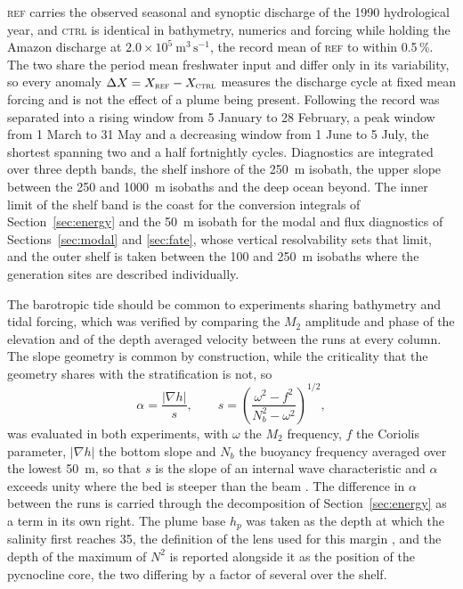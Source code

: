 \documentclass[a4paper,fleqn]{cas-sc}
\newcommand{\REF}{\textsc{ref}}
\newcommand{\CTRL}{\textsc{ctrl}}
\begin{document}
\REF{} carries the observed seasonal and synoptic discharge of the 1990 hydrological year, and \CTRL{} is identical in bathymetry, numerics and forcing while holding the Amazon discharge at $2.0\times10^{5}\ \mathrm{m^{3}\,s^{-1}}$, the record mean of \REF{} to within 0.5\,\%. The two share the period mean freshwater input and differ only in its variability, so every anomaly $\Delta X=X_{\REF}-X_{\CTRL}$ measures the discharge cycle at fixed mean forcing and is not the effect of a plume being present. Following \citet{nascimento:2026} the record was separated into a rising window from 5 January to 28 February, a peak window from 1 March to 31 May and a decreasing window from 1 June to 5 July, the shortest spanning two and a half fortnightly cycles. Diagnostics are integrated over three depth bands, the shelf inshore of the 250~m isobath, the upper slope between the 250 and 1000~m isobaths and the deep ocean beyond. The inner limit of the shelf band is the coast for the conversion integrals of Section~\ref{sec:energy} and the 50~m isobath for the modal and flux diagnostics of Sections~\ref{sec:modal} and \ref{sec:fate}, whose vertical resolvability sets that limit, and the outer shelf is taken between the 100 and 250~m isobaths where the generation sites are described individually.

The barotropic tide should be common to experiments sharing bathymetry and tidal forcing, which was verified by comparing the $M_{2}$ amplitude and phase of the elevation and of the depth averaged velocity between the runs at every column. The slope geometry is common by construction, while the criticality that the geometry shares with the stratification is not, so
\begin{equation}
\alpha=\frac{|\nabla h|}{s} ,
\qquad
s=\left(\frac{\omega^{2}-f^{2}}{N_{b}^{2}-\omega^{2}}\right)^{1/2} ,
\label{eq:criticality}
\end{equation}
was evaluated in both experiments, with $\omega$ the $M_{2}$ frequency, $f$ the Coriolis parameter, $|\nabla h|$ the bottom slope and $N_{b}$ the buoyancy frequency averaged over the lowest 50~m, so that $s$ is the slope of an internal wave characteristic and $\alpha$ exceeds unity where the bed is steeper than the beam \citep{baines:1982}. The difference in $\alpha$ between the runs is carried through the decomposition of Section~\ref{sec:energy} as a term in its own right. The plume base $h_{p}$ was taken as the depth at which the salinity first reaches 35, the definition of the lens used for this margin \citep{lentz1995seasonal,geyer1996physical}, and the depth of the maximum of $N^{2}$ is reported alongside it as the position of the pycnocline core, the two differing by a factor of several over the shelf.
\end{document}
